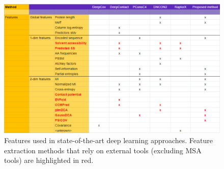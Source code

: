         \begin{figure}[H]
            \begin{center}
                \includegraphics[width=\textwidth, keepaspectratio]{imgs/features.png}
                \caption{Features used in state-of-the-art deep learning approaches.
                Feature extraction methods that rely on external tools (excluding
                MSA tools) are highlighted in red.}
                \label{features}
            \end{center}
        \end{figure}